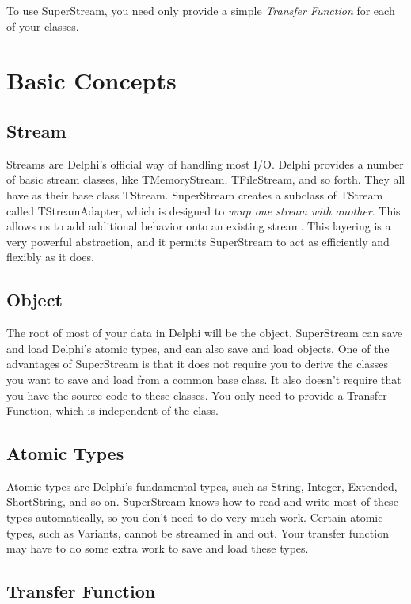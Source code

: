 \documentclass{report}
\begin{document}
To use SuperStream, you need only provide a simple \emph{Transfer Function}
for each of your classes.

\section{Basic Concepts}

\subsection{Stream}

Streams are Delphi's official way of handling most I/O.  Delphi provides a
number of basic stream classes, like TMemoryStream, TFileStream, and so
forth. They all have as their base class TStream. SuperStream creates a
subclass of TStream called TStreamAdapter, which is designed to \emph{wrap
one stream with another}. This allows us to add additional behavior onto an
existing stream. This layering is a very powerful abstraction, and it
permits SuperStream to act as efficiently and flexibly as it does.

\subsection{Object}

The root of most of your data in Delphi will be the object.  SuperStream can
save and load Delphi's atomic types, and can also save and load objects. 
One of the advantages of SuperStream is that it does not require you to
derive the classes you want to save and load from a common base class. It
also doesn't require that you have the source code to these classes. You
only need to provide a Transfer Function, which is independent of the class.

\subsection{Atomic Types}

Atomic types are Delphi's fundamental types, such as String, Integer,
Extended, ShortString, and so on. SuperStream knows how to read and write
most of these types automatically, so you don't need to do very much work.
Certain atomic types, such as Variants, cannot be streamed in and out. Your
transfer function may have to do some extra work to save and load these
types.

\subsection{Transfer Function}
\end{document}
